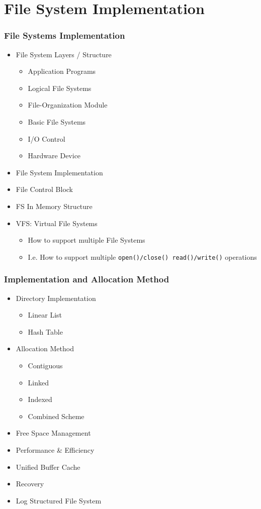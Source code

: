 \documentclass[aspectratio=169, xcolor=table, notheorems, hyperref={pdfpagelabels=false}]{beamer}
\begin{document}
\section{File System Implementation}
\begin{frame}[fragile]
\frametitle{File Systems Implementation}
\begin{itemize}
\item File System Layers / Structure
\begin{itemize}
\item Application Programs
\item Logical File Systems
\item File-Organization Module
\item Basic File Systems
\item I/O Control
\item Hardware Device
\end{itemize}
\item File System Implementation
\item File Control Block
\item FS In Memory Structure
\item VFS: Virtual File Systems
\begin{itemize}
\item How to support multiple File Systems
\item I.e. How to support multiple \texttt{open()/close() read()/write()} operations
\end{itemize}
\end{itemize}
\end{frame}

\begin{frame}[fragile]
\frametitle{Implementation and Allocation Method}
\begin{itemize}
\item Directory Implementation
\begin{itemize}
\item Linear List
\item Hash Table
\end{itemize}
\item {Allocation Method}
\begin{itemize}
\item Contiguous
\item Linked
\item Indexed
\item Combined Scheme
\end{itemize}
\item Free Space Management
\item Performance \& Efficiency
\item Unified Buffer Cache
\item Recovery
\item Log Structured File System
\end{itemize}
\end{frame}
\end{document}
